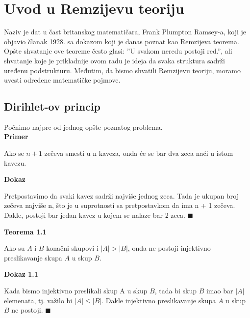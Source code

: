 \documentclass[12pt,a4paper]{article}
\begin{document}
	
	\tableofcontents
	\newpage
	
	\section{Uvod u Remzijevu teoriju}
	
	\noindent Naziv je dat u čast britanskog matematičara, Frank Plumpton Ramsey-a, koji je objavio članak
	1928. sa dokazom koji je danas poznat kao Remzijeva teorema. Opšte shvatanje ove teoreme često glasi:
	''U svakom neredu postoji red.'', ali shvatanje koje je prikladnije ovom radu je ideja da svaka
	struktura sadrži uređenu podstrukturu. Međutim, da bismo shvatili Remzijevu teoriju, moramo uvesti
	određene matematičke pojmove.

	\subsection{Dirihlet-ov princip}
	\vspace{0.5em}
	
	Počnimo najpre od jednog opšte poznatog problema.	
	\vspace{0.5em}
	\\
	{\noindent\fontsize{12pt}{12pt}\textbf{Primer}}
	\vspace{0.5em}
 	
	\noindent Ako se $n + 1$ zečeva smesti u n kaveza, onda će se bar dva zeca naći u istom kavezu.
	\vspace{0.5em}

	{\noindent\fontsize{12pt}{12pt}\textbf{Dokaz}}
	\vspace{0.5em}	

	\noindent Pretpostavimo da svaki kavez sadrži najviše jednog zeca. Tada je ukupan broj zečeva
	najviše n, što je u suprotnosti sa pretpostavkom da ima n + 1 zečeva. Dakle, postoji bar jedan kavez u kojem se nalaze bar 2 zeca. $\blacksquare$
	\vspace{1.5em}	

	{\noindent\fontsize{12pt}{12pt}\textbf{Teorema 1.1}}
	\vspace{0.5em}

	\noindent Ako su $A$ i $B$ konačni skupovi i $|A| > |B|$, onda ne postoji injektivno preslikavanje skupa $A$ u
	skup $B$.
	\vspace{0.5em}

	{\noindent\fontsize{12pt}{12pt}\textbf{Dokaz 1.1}}
	\vspace{0.5em}	

	\noindent  Kada bismo injektivno preslikali skup A
	u skup $B$, tada bi skup $B$ imao bar $|A|$ elemenata, tj. važilo bi $|A| \leq |B|$. Dakle injektivno preslikavanje skupa $A$ u skup $B$ ne postoji. $\blacksquare$
\end{document}
